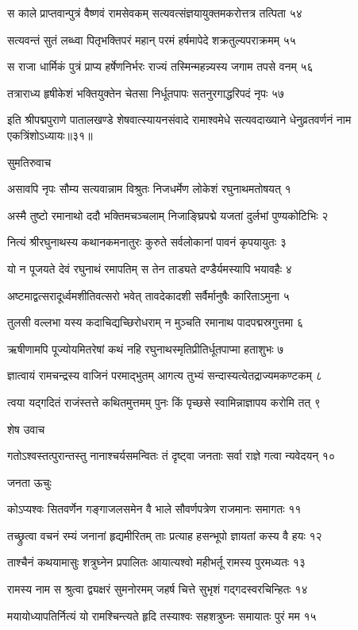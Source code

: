 स काले प्राप्तवान्पुत्रं वैष्णवं रामसेवकम्
सत्यवत्संज्ञयायुक्तमकरोत्तत्र तत्पिता ५४

सत्यवन्तं सुतं लब्ध्वा पितृभक्तिपरं महान्
परमं हर्षमापेदे शक्रतुल्यपराक्रमम् ५५

स राजा धार्मिकं पुत्रं प्राप्य हर्षेणनिर्भरः
राज्यं तस्मिन्महन्न्यस्य जगाम तपसे वनम् ५६

तत्राराध्य हृषीकेशं भक्तियुक्तेन चेतसा
निर्धूतपापः सतनुरगाद्धरिपदं नृपः ५७

इति श्रीपद्मपुराणे पातालखण्डे शेषवात्स्यायनसंवादे रामाश्वमेधे सत्यवदाख्याने धेनुव्रतवर्णनं नाम एकत्रिंशोऽध्यायः॥३१॥


सुमतिरुवाच

असावपि नृपः सौम्य सत्यवान्नाम विश्रुतः
निजधर्मेण लोकेशं रघुनाथमतोषयत् १

अस्मै तुष्टो रमानाथो ददौ भक्तिमचञ्चलाम्
निजाङ्घ्रिपद्मे यजतां दुर्लभां पुण्यकोटिभिः २

नित्यं श्रीरघुनाथस्य कथानकमनातुरः
कुरुते सर्वलोकानां पावनं कृपयायुतः ३

यो न पूजयते देवं रघुनाथं रमापतिम्
स तेन ताड्यते दण्डैर्यमस्यापि भयावहैः ४

अष्टमाद्वत्सरादूर्ध्वमशीतिवत्सरो भवेत्
तावदेकादशी सर्वैर्मानुषैः कारिताऽमुना ५

तुलसी वल्लभा यस्य कदाचिद्यच्छिरोधराम्
न मुञ्चति रमानाथ पादपद्मस्रगुत्तमा ६

ऋषीणामपि पूज्योयमितरेषां कथं नहि
रघुनाथस्मृतिप्रीतिर्धूतपाप्मा हताशुभः ७

ज्ञात्वायं रामचन्द्रस्य वाजिनं परमाद्भुतम्
आगत्य तुभ्यं सन्दास्यत्येतद्राज्यमकण्टकम् ८

त्वया यद्गदितं राजंस्तत्ते कथितमुत्तमम्
पुनः किं पृच्छसे स्वामिन्नाज्ञापय करोमि तत् ९

शेष उवाच

गतोऽश्वस्तत्पुरान्तस्तु नानाश्चर्यसमन्वितः
तं दृष्ट्वा जनताः सर्वा राज्ञे गत्वा न्यवेदयन् १०

जनता ऊचुः

कोऽप्यश्वः सितवर्णेन गङ्गाजलसमेन वै
भाले सौवर्णपत्रेण राजमानः समागतः ११

तच्छ्रुत्वा वचनं रम्यं जनानां हृद्यमीरितम्
ताः प्रत्याह हसन्भूपो ज्ञायतां कस्य वै हयः १२

ताश्चैनं कथयामासुः शत्रुघ्नेन प्रपालितः
आयात्यश्वो महीभर्तू रामस्य पुरमध्यतः १३

रामस्य नाम स श्रुत्वा द्व्यक्षरं सुमनोरमम्
जहर्ष चित्ते सुभृशं गद्गदस्वरचिन्हितः १४

मयायोध्यापतिर्नित्यं यो रामश्चिन्त्यते हृदि
तस्याश्वः सहशत्रुघ्नः समायातः पुरं मम १५


